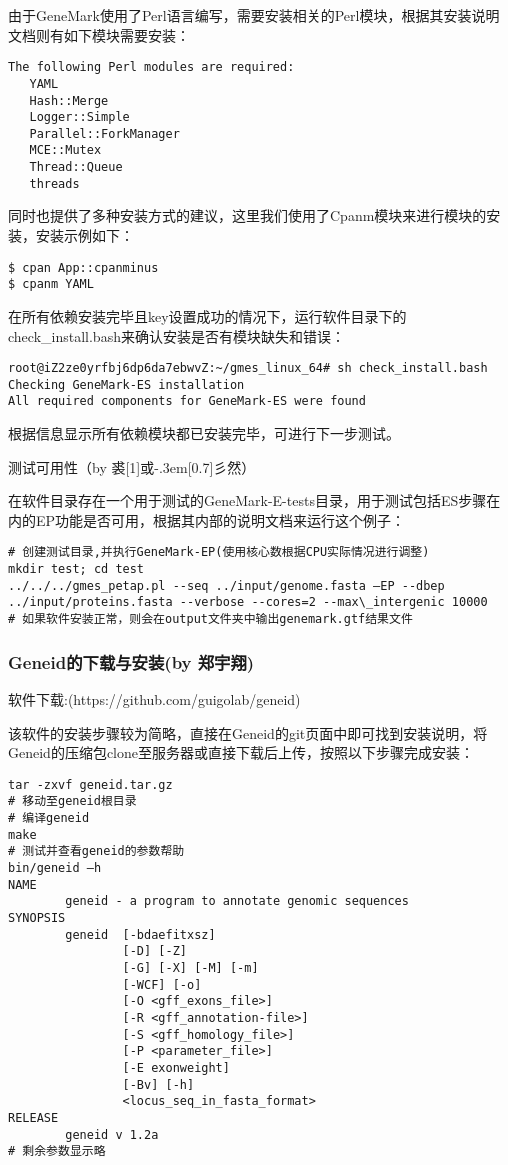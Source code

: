 \documentclass[12pt]{ctexart}
\newcommand{\yu}{\hbox{\scalebox{1}[1]{或}\kern-.3em\scalebox{0.3}[0.7]{彡}}}
\begin{document}
由于GeneMark使用了Perl语言编写，需要安装相关的Perl模块，根据其安装说明文档则有如下模块需要安装：

\begin{lstlisting}
The following Perl modules are required:
   YAML
   Hash::Merge
   Logger::Simple
   Parallel::ForkManager
   MCE::Mutex
   Thread::Queue
   threads
\end{lstlisting}

同时也提供了多种安装方式的建议，这里我们使用了Cpanm模块来进行模块的安装，安装示例如下：

\begin{lstlisting}
$ cpan App::cpanminus
$ cpanm YAML
\end{lstlisting}

在所有依赖安装完毕且key设置成功的情况下，运行软件目录下的check\_install.bash来确认安装是否有模块缺失和错误：

\begin{lstlisting}
root@iZ2ze0yrfbj6dp6da7ebwvZ:~/gmes_linux_64# sh check_install.bash
Checking GeneMark-ES installation
All required components for GeneMark-ES were found
\end{lstlisting}

根据信息显示所有依赖模块都已安装完毕，可进行下一步测试。

测试可用性（by 裘\yu 然）

在软件目录存在一个用于测试的GeneMark-E-tests目录，用于测试包括ES步骤在内的EP功能是否可用，根据其内部的说明文档来运行这个例子：

\begin{lstlisting}
# 创建测试目录,并执行GeneMark-EP(使用核心数根据CPU实际情况进行调整)
mkdir test; cd test
../../../gmes_petap.pl --seq ../input/genome.fasta –EP --dbep ../input/proteins.fasta --verbose --cores=2 --max\_intergenic 10000
# 如果软件安装正常，则会在output文件夹中输出genemark.gtf结果文件

\end{lstlisting}
\subsubsection{Geneid的下载与安装(by 郑宇翔)}
软件下载:(https://github.com/guigolab/geneid)

该软件的安装步骤较为简略，直接在Geneid的git页面中即可找到安装说明，将Geneid的压缩包clone至服务器或直接下载后上传，按照以下步骤完成安装\citep{doi:10.1002/0471250953.bi0403s18}：
\begin{lstlisting}
tar -zxvf geneid.tar.gz
# 移动至geneid根目录
# 编译geneid
make 
# 测试并查看geneid的参数帮助
bin/geneid –h
NAME
        geneid - a program to annotate genomic sequences
SYNOPSIS
        geneid  [-bdaefitxsz]
                [-D] [-Z]
                [-G] [-X] [-M] [-m]
                [-WCF] [-o]
                [-O <gff_exons_file>]
                [-R <gff_annotation-file>]
                [-S <gff_homology_file>]
                [-P <parameter_file>]
                [-E exonweight]
                [-Bv] [-h]
                <locus_seq_in_fasta_format>
RELEASE
        geneid v 1.2a
# 剩余参数显示略 


\end{lstlisting}
\end{document}
